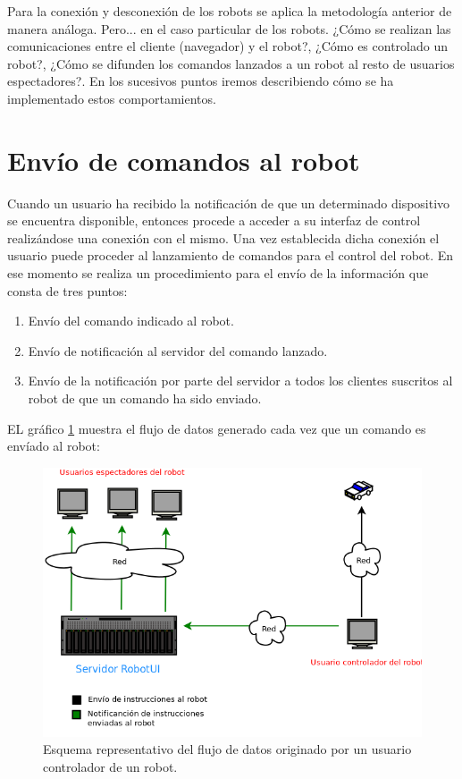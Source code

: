  Para la conexión y desconexión de los robots se aplica la metodología anterior de manera análoga. Pero... en el caso particular de los robots. ¿Cómo se realizan las 
 comunicaciones entre el cliente (navegador) y el robot?, ¿Cómo es controlado un robot?, ¿Cómo se difunden los comandos lanzados a un robot al resto de usuarios espectadores?. En los sucesivos puntos iremos describiendo cómo se ha implementado estos
 comportamientos.\\
 
  
\section{Envío de comandos al robot}
  
  Cuando un usuario ha recibido la notificación de que un determinado dispositivo se encuentra disponible, entonces procede a acceder a su interfaz de control realizándose una conexión con el mismo.  Una vez establecida 
  dicha conexión el usuario puede proceder al lanzamiento de comandos para el control del robot. En ese momento se realiza un procedimiento para el envío de la información que consta de tres puntos:
    
 \begin{enumerate}
  \item Envío del comando indicado al robot.\\
  \item Envío de notificación al servidor del comando lanzado. 
  \item Envío de la notificación por parte del servidor a todos los clientes suscritos al robot de que un comando ha sido enviado.
 \end{enumerate}

 EL gráfico \ref{diagram:conexiones-controlador} muestra el flujo de datos generado cada vez que un comando es envíado al robot:
 
\begin{figure}[H]
  \begin{center}
    \includegraphics[scale=0.5]{diagramas/flujo_comunicaciones_controlador.png}
  \end{center}
  \caption{Esquema representativo del flujo de datos originado por un usuario controlador de un robot.}
  \label{diagram:conexiones-controlador}
\end{figure}
 
